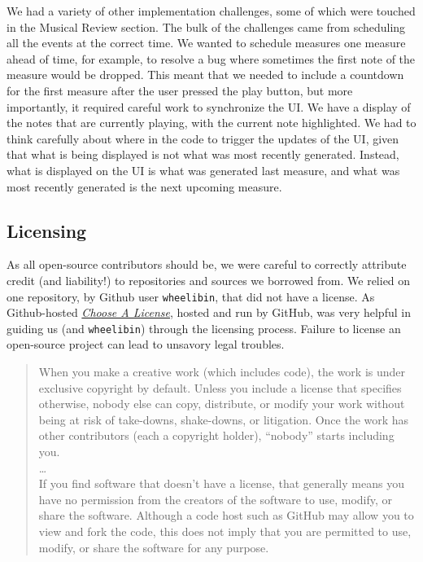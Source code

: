 \documentclass[12pt,a4paper]{article}
\newcommand{\code}{\texttt}
\begin{document}
We had a variety of other implementation challenges, some of which were touched in the Musical Review section. The bulk of the challenges came from scheduling all the events at the correct time. We wanted to schedule measures one measure ahead of time, for example, to resolve a bug where sometimes the first note of the measure would be dropped. This meant that we needed to include a countdown for the first measure after the user pressed the play button, but more importantly, it required careful work to synchronize the UI. We have a display of the notes that are currently playing, with the current note highlighted. We had to think carefully about where in the code to trigger the updates of the UI, given that what is being displayed is not what was most recently generated. Instead, what is displayed on the UI is what was generated last measure, and what was most recently generated is the next upcoming measure.

\subsection{Licensing}

As all open-source contributors should be, we were careful to correctly attribute credit (and liability!) to repositories and sources we borrowed from. We relied on one repository, by Github user \code{wheelibin}, that did not have a license. As Github-hosted \href{https://choosealicense.com/}{\textit{Choose A License}}, hosted and run by GitHub, was very helpful in guiding us (and \code{wheelibin}) through the licensing process. Failure to license an open-source project can lead to unsavory legal troubles.

\begin{quote}
When you make a creative work (which includes code), the work is under exclusive copyright by default. Unless you include a license that specifies otherwise, nobody else can copy, distribute, or modify your work without being at risk of take-downs, shake-downs, or litigation. Once the work has other contributors (each a copyright holder), “nobody” starts including you. \\
\dots \\
If you find software that doesn’t have a license, that generally means you have no permission from the creators of the software to use, modify, or share the software. Although a code host such as GitHub may allow you to view and fork the code, this does not imply that you are permitted to use, modify, or share the software for any purpose. \cite{choose-license-none}
\end{quote}
\end{document}

